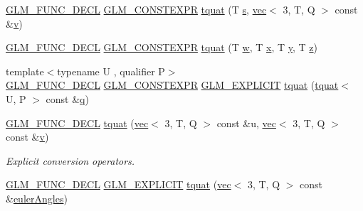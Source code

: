 \begin{DoxyCompactItemize}
\mbox{\hyperlink{setup_8hpp_ab2d052de21a70539923e9bcbf6e83a51}{G\+L\+M\+\_\+\+F\+U\+N\+C\+\_\+\+D\+E\+CL}} \mbox{\hyperlink{setup_8hpp_a08b807947b47031d3a511f03f89645ad}{G\+L\+M\+\_\+\+C\+O\+N\+S\+T\+E\+X\+PR}} \mbox{\hyperlink{structglm_1_1tquat_a5abf4c68775ef307edb54e7e0bdf85ca}{tquat}} (T \mbox{\hyperlink{_s_d_l__opengl_8h_a4af680a6c683f88ed67b76f207f2e6e4}{s}}, \mbox{\hyperlink{structglm_1_1vec}{vec}}$<$ 3, T, Q $>$ const \&\mbox{\hyperlink{_s_d_l__opengl_8h_a10a82eabcb59d2fcd74acee063775f90}{v}})
\item 
\mbox{\hyperlink{setup_8hpp_ab2d052de21a70539923e9bcbf6e83a51}{G\+L\+M\+\_\+\+F\+U\+N\+C\+\_\+\+D\+E\+CL}} \mbox{\hyperlink{setup_8hpp_a08b807947b47031d3a511f03f89645ad}{G\+L\+M\+\_\+\+C\+O\+N\+S\+T\+E\+X\+PR}} \mbox{\hyperlink{structglm_1_1tquat_a8b6304133e69ca2166eb8e467c79ce71}{tquat}} (T \mbox{\hyperlink{_s_d_l__opengl__glext_8h_a6ee8f168a7ab6785a9bb57c6715dad99}{w}}, T \mbox{\hyperlink{_s_d_l__opengl_8h_ad0e63d0edcdbd3d79554076bf309fd47}{x}}, T \mbox{\hyperlink{_s_d_l__opengl_8h_a1675d9d7bb68e1657ff028643b4037e3}{y}}, T \mbox{\hyperlink{_s_d_l__opengl__glext_8h_a5e74030ebb3297ce1b37ff716fedd68f}{z}})
\item 
{\footnotesize template$<$typename U , qualifier P$>$ }\\\mbox{\hyperlink{setup_8hpp_ab2d052de21a70539923e9bcbf6e83a51}{G\+L\+M\+\_\+\+F\+U\+N\+C\+\_\+\+D\+E\+CL}} \mbox{\hyperlink{setup_8hpp_a08b807947b47031d3a511f03f89645ad}{G\+L\+M\+\_\+\+C\+O\+N\+S\+T\+E\+X\+PR}} \mbox{\hyperlink{setup_8hpp_a6c74f5a5e7b134ab69023ff9a30d4d5d}{G\+L\+M\+\_\+\+E\+X\+P\+L\+I\+C\+IT}} \mbox{\hyperlink{structglm_1_1tquat_a8d341e16c31f258a3550123eea5671f0}{tquat}} (\mbox{\hyperlink{structglm_1_1tquat}{tquat}}$<$ U, P $>$ const \&\mbox{\hyperlink{_s_d_l__opengl_8h_a8fc1e7b9baaae687804c7eed46ca09c6}{q}})
\item 
\mbox{\hyperlink{setup_8hpp_ab2d052de21a70539923e9bcbf6e83a51}{G\+L\+M\+\_\+\+F\+U\+N\+C\+\_\+\+D\+E\+CL}} \mbox{\hyperlink{structglm_1_1tquat_ad0b0aeae222fe05fb5d26fd40d74b9b6}{tquat}} (\mbox{\hyperlink{structglm_1_1vec}{vec}}$<$ 3, T, Q $>$ const \&u, \mbox{\hyperlink{structglm_1_1vec}{vec}}$<$ 3, T, Q $>$ const \&\mbox{\hyperlink{_s_d_l__opengl_8h_a10a82eabcb59d2fcd74acee063775f90}{v}})
\begin{DoxyCompactList}\small\item\em Explicit conversion operators. \end{DoxyCompactList}\item 
\mbox{\hyperlink{setup_8hpp_ab2d052de21a70539923e9bcbf6e83a51}{G\+L\+M\+\_\+\+F\+U\+N\+C\+\_\+\+D\+E\+CL}} \mbox{\hyperlink{setup_8hpp_a6c74f5a5e7b134ab69023ff9a30d4d5d}{G\+L\+M\+\_\+\+E\+X\+P\+L\+I\+C\+IT}} \mbox{\hyperlink{structglm_1_1tquat_a98289988d4e4970f9b45132f8f33759a}{tquat}} (\mbox{\hyperlink{structglm_1_1vec}{vec}}$<$ 3, T, Q $>$ const \&\mbox{\hyperlink{group__gtc__quaternion_gaf21424fa62e03de8b11c2b776c17d7a3}{euler\+Angles}})

\end{DoxyCompactItemize}
